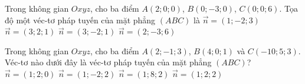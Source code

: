 \begin{ex}%
	Trong không gian $Oxyz$, cho ba điểm $A(2;0;0)$, $B(0;-3;0)$, $C(0;0;6)$. Tọa độ một véc-tơ pháp tuyến của mặt phẳng $(ABC)$ là
	\choice
	{$\overrightarrow{n}=(1;-2;3)$}
	{$\overrightarrow{n}=(3;2;1)$}
	{\True $\overrightarrow{n}=(3;-2;1)$}
	{$\overrightarrow{n}=(2;-3;6)$}
\end{ex}
\begin{ex}
	Trong không gian $Oxyz$, cho ba điểm $A(2;-1;3)$, $B(4;0;1)$ và $C(-10;5;3)$. Véc-tơ nào dưới đây là véc-tơ pháp tuyến của mặt phẳng $(ABC)$?
	\choice
	{$\overrightarrow{n}=(1;2;0)$}
	{$\overrightarrow{n}=(1;-2;2)$}
	{$\overrightarrow{n}=(1;8;2)$}
	{\True $\overrightarrow{n}=(1;2;2)$}
\end{ex}

